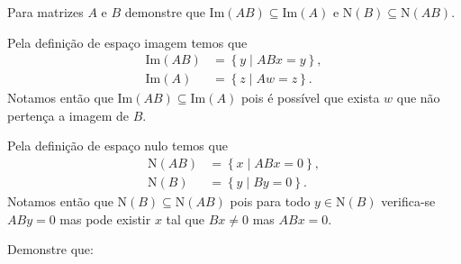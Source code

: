 \documentclass[a4paper,12pt, leqno, answers]{exam}
\newcommand{\EI}{\text{Im}}
\newcommand{\EN}{\text{N}}
\newcommand{\posto}{\text{posto}}
\begin{document}
\begin{questions}
    \question Para matrizes $A$ e $B$ demonstre que $\EI (A B) \subseteq \EI (A)$ e $\EN (B) \subseteq \EN (A B)$.
    \begin{solution}
        Pela defini\c{c}\~{a}o de espa\c{c}o imagem temos que
        \begin{align*}
            \EI (A B) &= \left\{ y \mid A B x = y \right\}, \\
            \EI (A) &= \left\{ z \mid A w = z \right\}.
        \end{align*}
        Notamos ent\~{a}o que $\EI (A B) \subseteq \EI (A)$ pois \'{e} poss\'{i}vel que exista $w$ que n\~{a}o perten\c{c}a a imagem de $B$.

        Pela defini\c{c}\~{a}o de espa\c{c}o nulo temos que
        \begin{align*}
            \EN (A B) &= \left\{ x \mid A B x = 0 \right\}, \\
            \EN (B) &= \left\{ y \mid B y = 0 \right\}.
        \end{align*}
        Notamos ent\~{a}o que $\EN (B) \subseteq \EN (A B)$ pois para todo $y \in \EN (B)$ verifica-se $A B y = 0$ mas pode existir $x$ tal que $B x \neq 0$ mas $ A B x = 0$.
    \end{solution}

    \question Demonstre que:
\end{questions}
\end{document}
